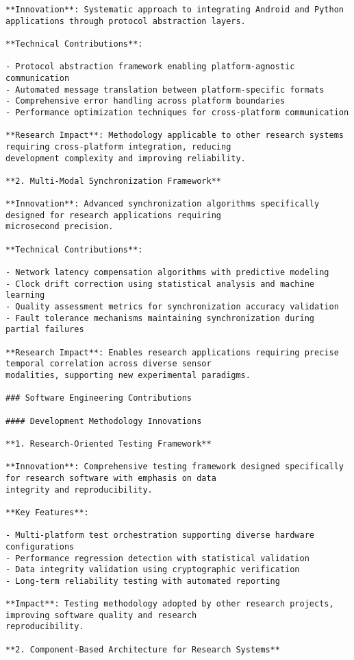 \documentclass[12pt,a4paper]{report}
\begin{document}
\begin{verbatim}
**Innovation**: Systematic approach to integrating Android and Python applications through protocol abstraction layers.

**Technical Contributions**:

- Protocol abstraction framework enabling platform-agnostic communication
- Automated message translation between platform-specific formats
- Comprehensive error handling across platform boundaries
- Performance optimization techniques for cross-platform communication

**Research Impact**: Methodology applicable to other research systems requiring cross-platform integration, reducing
development complexity and improving reliability.

**2. Multi-Modal Synchronization Framework**

**Innovation**: Advanced synchronization algorithms specifically designed for research applications requiring
microsecond precision.

**Technical Contributions**:

- Network latency compensation algorithms with predictive modeling
- Clock drift correction using statistical analysis and machine learning
- Quality assessment metrics for synchronization accuracy validation
- Fault tolerance mechanisms maintaining synchronization during partial failures

**Research Impact**: Enables research applications requiring precise temporal correlation across diverse sensor
modalities, supporting new experimental paradigms.

### Software Engineering Contributions

#### Development Methodology Innovations

**1. Research-Oriented Testing Framework**

**Innovation**: Comprehensive testing framework designed specifically for research software with emphasis on data
integrity and reproducibility.

**Key Features**:

- Multi-platform test orchestration supporting diverse hardware configurations
- Performance regression detection with statistical validation
- Data integrity validation using cryptographic verification
- Long-term reliability testing with automated reporting

**Impact**: Testing methodology adopted by other research projects, improving software quality and research
reproducibility.

**2. Component-Based Architecture for Research Systems**


\end{verbatim}
\end{document}
